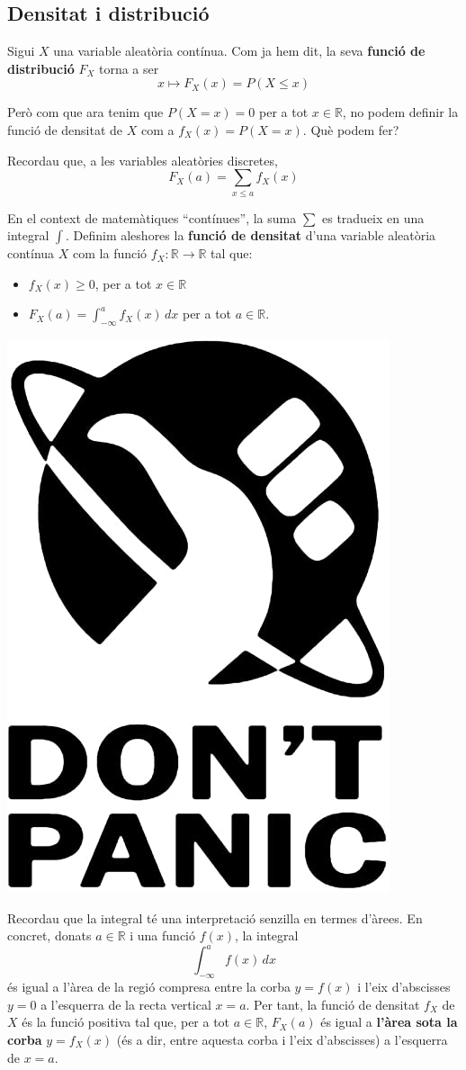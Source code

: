 \documentclass[
]{book}
\renewcommand{\leq}{\leqslant}
\renewcommand{\geq}{\geqslant}
\theoremstyle{definition}
\theoremstyle{definition}
\theoremstyle{definition}
\theoremstyle{remark}
\begin{document}
\hypertarget{densitat-i-distribuciuxf3-1}{%
\subsection{Densitat i distribució}\label{densitat-i-distribuciuxf3-1}}

Sigui \(X\) una variable aleatòria contínua. Com ja hem dit, la seva \textbf{funció de distribució} \(F_X\) torna a ser
\[
x\mapsto F_X(x)=P(X\leq x)
\]

Però com que ara tenim que \(P(X=x)=0\) per a tot \(x\in \mathbb{R}\), no podem definir la funció de densitat de \(X\) com a \(f_X(x)=P(X=x)\). Què podem fer?

Recordau que, a les variables aleatòries discretes,
\[
F_X(a)=\sum_{x\leq a} f_X(x)
\]

En el context de matemàtiques ``contínues'', la suma \(\sum\) es tradueix en una integral \(\int\). Definim aleshores la \textbf{funció de densitat} d'una variable aleatòria contínua \(X\) com la funció \(f_X:\mathbb{R}\to \mathbb{R}\) tal que:

\begin{itemize}
\item
  \(f_X(x)\geq 0\), per a tot \(x\in \mathbb{R}\)
\item
  \(\displaystyle F_X(a)=\int_{-\infty}^a f_{X}(x)\, dx\) per a tot \(a \in \mathbb{R}\).
\end{itemize}

\begin{center}\includegraphics[width=0.2\linewidth]{Bioestadistica-II_files/figure-html/dontpanic} \end{center}

Recordau que la integral té una interpretació senzilla en termes d'àrees. En concret, donats \(a \in \mathbb{R}\) i una funció \(f(x)\), la integral
\[
\int_{-\infty}^a f(x)\, dx
\]
és igual a l'àrea de la regió compresa entre la corba \(y=f(x)\) i l'eix d'abscisses \(y=0\) a l'esquerra de la recta vertical \(x=a\). Per tant, la funció de densitat \(f_X\) de \(X\) és la funció positiva tal que, per a tot \(a\in \mathbb{R}\), \(F_X(a)\) és igual a \textbf{l'àrea sota la corba} \(y=f_X(x)\) (és a dir, entre aquesta corba i l'eix d'abscisses) a l'esquerra de \(x=a\).
\end{document}
